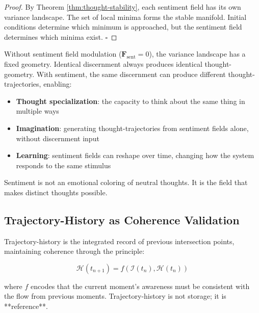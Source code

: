 \begin{proof}
By Theorem \ref{thm:thought-stability}, each sentiment field has its own variance landscape. The set of local minima forms the stable manifold. Initial conditions determine which minimum is approached, but the sentiment field determines which minima exist. $\square$
\end{proof}

\begin{corollary}
\label{cor:sentiment-essential}
Without sentiment field modulation ($\mathbf{F}_{\text{sent}} = 0$), the variance landscape has a fixed geometry. Identical discernment always produces identical thought-geometry. With sentiment, the same discernment can produce different thought-trajectories, enabling:

\begin{itemize}
\item \textbf{Thought specialization}: the capacity to think about the same thing in multiple ways
\item \textbf{Imagination}: generating thought-trajectories from sentiment fields alone, without discernment input
\item \textbf{Learning}: sentiment fields can reshape over time, changing how the system responds to the same stimulus
\end{itemize}

Sentiment is not an emotional coloring of neutral thoughts. It is the field that makes distinct thoughts possible.
\end{corollary}

\subsection{Trajectory-History as Coherence Validation}

\begin{definition}
\label{def:trajectory-history}
Trajectory-history is the integrated record of previous intersection points, maintaining coherence through the principle:

$$\mathcal{H}(t_{n+1}) = f(\mathcal{I}(t_n), \mathcal{H}(t_n))$$

where $f$ encodes that the current moment's awareness must be consistent with the flow from previous moments. Trajectory-history is not storage; it is **reference**.
\end{definition}

